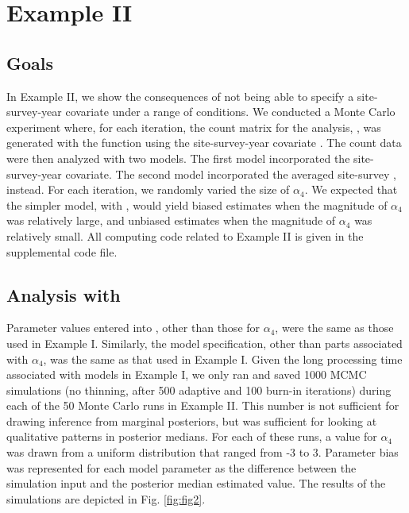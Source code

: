 \documentclass[codesnippet]{jss}
\begin{document}
\section[Example II]{Example II}
\subsection[Goals]{Goals}
In Example II, we show the consequences of not being able to specify a site-survey-year covariate under a range of conditions. We conducted a Monte Carlo experiment where, for each iteration, the count matrix for the analysis, , was generated with the  function using the site-survey-year covariate . The count data were then analyzed with two  models. The first model incorporated the site-survey-year  covariate. The second model incorporated the averaged site-survey , instead. For each iteration, we randomly varied the size of $\alpha_4$. We expected that the simpler model, with , would yield biased estimates when the magnitude of $\alpha_4$ was relatively large, and unbiased estimates when the magnitude of $\alpha_4$ was relatively small. All computing code related to Example II is given in the supplemental code file.

\subsection[Analysis with JAGS]{Analysis with }
Parameter values entered into , other than those for $\alpha_4$, were the same as those used in Example I.  Similarly, the  model specification, other than parts associated with $\alpha_4$, was the same as that used in Example I. Given the long processing time associated with  models in Example I, we only ran and saved 1000 MCMC simulations (no thinning, after 500 adaptive and 100 burn-in iterations) during each of the 50 Monte Carlo runs in Example II. This number is not sufficient for drawing inference from marginal posteriors, but was sufficient for looking at qualitative patterns in posterior medians. For each of these runs, a value for $\alpha_4$ was drawn from a uniform distribution that ranged from -3 to 3. Parameter bias was represented for each model parameter as the difference between the simulation input and the posterior median estimated value. The results of the simulations are depicted in Fig. \ref{fig:fig2}.
\end{document}
